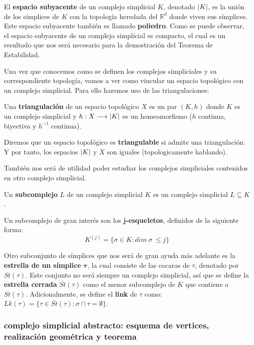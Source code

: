 El \textbf{espacio subyacente} de un complejo simplicial $K$, denotado $\lvert K\rvert$, es la unión de los símplices de $K$ con la topología heredada del $\mathbb{R}^d$ donde viven sus símplices. Este espacio subyacente también es llamado \textbf{poliedro}. Como se puede observar, el espacio subyacente  de un complejo simplicial es compacto, el cual es un resultado que nos será necesario para la demostración del Teorema de Estabilidad.

Una vez que conocemos como se definen los complejos simpliciales y su correspondiente topología, vamos a ver como vincular un espacio topológico con un complejo simplicial. Para ello haremos uso de las triangulaciones:

\begin{definition}
Una \textbf{triangulación} de un espacio topológico $X$ es un par $(K, h)$ donde $K$ es un complejo simplicial y $h: X \longrightarrow \lvert K\rvert$ es un homeomorfismo ($h$ continua, biyectiva y $h^{-1}$ continua).
\end{definition}
Diremos que un espacio topológico es \textbf{triangulable} si admite una triangulación. Y por tanto, los espacios $\lvert K\rvert$ y $X$ son iguales (topologicamente hablando).

También nos será de utilidad poder estudiar los complejos simpliciales contenidos en otro complejo simplicial.
\begin{definition}
Un \textbf{subcomplejo} $L$ de un complejo simplicial $K$ es un complejo simplicial $L \subseteq K$.
\end{definition}

Un subcomplejo de gran interés son los $\bm{j}$\textbf{-esqueletos}, definidos de la siguiente forma: \[K^{(j)} = \{\sigma \in K : dim\ \sigma\ \leq j\}\]

Otro subconjunto de símplices que nos será de gran ayuda más adelante es la \textbf{estrella de un símplice} $\bm{\tau}$, la cual consiste de las cocaras de $\tau$, denotado por $St(\tau)$. Este conjunto no será siempre un complejo simplicial, así que se define la \textbf{estrella cerrada} $\overline{St}(\tau)$ como el menor subcomplejo de $K$ que contiene a $St(\tau)$. Adicionalmente, se define el \textbf{link} de $\tau$ como: $Lk(\tau) = \{\tau \in \overline{St}(\tau): \sigma \cap \tau = \emptyset\}$.

\subsubsection*{complejo simplicial abstracto: esquema de vertices, realización geométrica y teorema}
